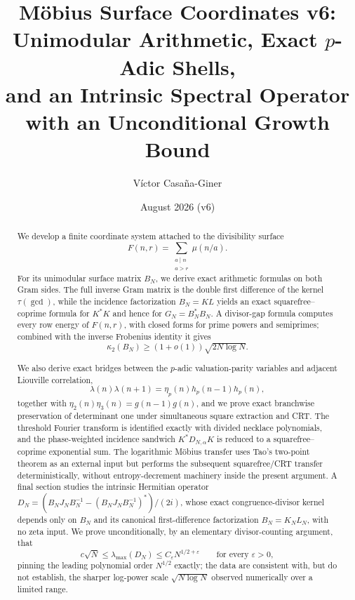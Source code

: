 \documentclass[11pt]{amsart}
\title{Möbius Surface Coordinates v6: Unimodular Arithmetic, Exact $p$-Adic Shells,\\and an Intrinsic Spectral Operator with an Unconditional Growth Bound}
\author{Víctor Casaña-Giner}
\date{August 2026 (v6)}
\numberwithin{equation}{section}
\theoremstyle{plain}
\theoremstyle{definition}
\theoremstyle{remark}
\newcommand{\eps}{\varepsilon}
\newcommand{\mob}{\mu}
\newcommand{\liou}{\lambda}
\newcommand{\Fsurf}{F}
\begin{document}
\pagestyle{plain}

\begin{abstract}
We develop a finite coordinate system attached to the divisibility surface
\begin{equation}
\Fsurf(n,r)=\sum_{\substack{a\mid n\\a>r}}\mob(n/a).
\label{eq:abstract_surface}
\end{equation}
For its unimodular surface matrix $B_N$, we derive exact arithmetic formulas on both Gram sides.  The full inverse Gram matrix is the double first difference of the kernel $\tau(\gcd)$, while the incidence factorization $B_N=KL$ yields an exact squarefree--coprime formula for $K^*K$ and hence for $G_N=B_N^*B_N$.  A divisor-gap formula computes every row energy of $F(n,r)$, with closed forms for prime powers and semiprimes; combined with the inverse Frobenius identity it gives
\begin{equation}
\kappa_2(B_N)\ge (1+o(1))\sqrt{2N\log N}.
\label{eq:abstract_condition_number}
\end{equation}

We also derive exact bridges between the $p$-adic valuation-parity variables and adjacent Liouville correlation,
\begin{equation}
\liou(n)\liou(n+1)=\eta_p(n)h_p(n-1)h_p(n),
\label{eq:abstract_eta_lambda_bridge}
\end{equation}
together with $\eta_2(n)\eta_3(n)=g(n-1)g(n)$, and we prove exact branchwise preservation of determinant one under simultaneous square extraction and CRT.  The threshold Fourier transform is identified exactly with divided necklace polynomials, and the phase-weighted incidence sandwich $K^*D_{N,\alpha}K$ is reduced to a squarefree--coprime exponential sum.  The logarithmic Möbius transfer uses Tao's two-point theorem as an external input but performs the subsequent squarefree/CRT transfer deterministically, without entropy-decrement machinery inside the present argument.  A final section studies the intrinsic Hermitian operator $D_N=(B_NJ_NB_N^{-1}-(B_NJ_NB_N^{-1})^*)/(2i)$, whose exact congruence-divisor kernel depends only on $B_N$ and its canonical first-difference factorization $B_N=K_NL_N$, with no zeta input.  We prove unconditionally, by an elementary divisor-counting argument, that
\begin{equation}
c\sqrt N\le\lambda_{\max}(D_N)\le C_\eps N^{1/2+\eps}
\qquad\text{for every }\eps>0,
\label{eq:abstract_frobenius_bound}
\end{equation}
pinning the leading polynomial order $N^{1/2}$ exactly; the data are consistent with, but do not establish, the sharper log-power scale $\sqrt{N\log N}$ observed numerically over a limited range.
\end{abstract}
\end{document}
